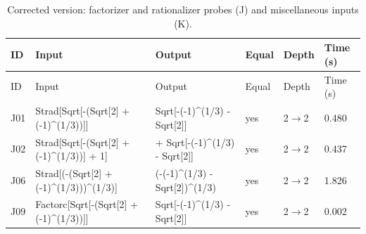 \begin{longtable}{@{}p{}>{\ttfamily\footnotesize\raggedright\arraybackslash}p{}>{\ttfamily\footnotesize\raggedright\arraybackslash}p{}p{}p{}p{}@{}}
\caption{Corrected version: factorizer and rationalizer probes (J) and miscellaneous inputs (K).}\label{tab:fixedJK}\\
\toprule ID & Input & Output & Equal & Depth & Time (s)\\\midrule\endfirsthead
\toprule ID & Input & Output & Equal & Depth & Time (s)\\\midrule\endhead
\bottomrule\endfoot
J01 & Strad[\allowbreak{}Sqrt[\allowbreak{}-(\allowbreak{}Sqrt[\allowbreak{}2]\allowbreak{} +\allowbreak{} (\allowbreak{}-1)\allowbreak{}\textasciicircum{}\allowbreak{}(\allowbreak{}1/\allowbreak{}3)\allowbreak{})\allowbreak{}]\allowbreak{}]\allowbreak{} & Sqrt[\allowbreak{}-(\allowbreak{}-1)\allowbreak{}\textasciicircum{}\allowbreak{}(\allowbreak{}1/\allowbreak{}3)\allowbreak{} -\allowbreak{} Sqrt[\allowbreak{}2]\allowbreak{}]\allowbreak{} & yes & 2$\to$2 & 0.480\\
J02 & Strad[\allowbreak{}Sqrt[\allowbreak{}-(\allowbreak{}Sqrt[\allowbreak{}2]\allowbreak{} +\allowbreak{} (\allowbreak{}-1)\allowbreak{}\textasciicircum{}\allowbreak{}(\allowbreak{}1/\allowbreak{}3)\allowbreak{})\allowbreak{}]\allowbreak{} +\allowbreak{} 1]\allowbreak{} & 1 +\allowbreak{} Sqrt[\allowbreak{}-(\allowbreak{}-1)\allowbreak{}\textasciicircum{}\allowbreak{}(\allowbreak{}1/\allowbreak{}3)\allowbreak{} -\allowbreak{} Sqrt[\allowbreak{}2]\allowbreak{}]\allowbreak{} & yes & 2$\to$2 & 0.437\\
J06 & Strad[\allowbreak{}(\allowbreak{}-(\allowbreak{}Sqrt[\allowbreak{}2]\allowbreak{} +\allowbreak{} (\allowbreak{}-1)\allowbreak{}\textasciicircum{}\allowbreak{}(\allowbreak{}1/\allowbreak{}3)\allowbreak{})\allowbreak{})\allowbreak{}\textasciicircum{}\allowbreak{}(\allowbreak{}1/\allowbreak{}3)\allowbreak{}]\allowbreak{} & (\allowbreak{}-(\allowbreak{}-1)\allowbreak{}\textasciicircum{}\allowbreak{}(\allowbreak{}1/\allowbreak{}3)\allowbreak{} -\allowbreak{} Sqrt[\allowbreak{}2]\allowbreak{})\allowbreak{}\textasciicircum{}\allowbreak{}(\allowbreak{}1/\allowbreak{}3)\allowbreak{} & yes & 2$\to$2 & 1.826\\
J09 & Factorc[\allowbreak{}Sqrt[\allowbreak{}-(\allowbreak{}Sqrt[\allowbreak{}2]\allowbreak{} +\allowbreak{} (\allowbreak{}-1)\allowbreak{}\textasciicircum{}\allowbreak{}(\allowbreak{}1/\allowbreak{}3)\allowbreak{})\allowbreak{}]\allowbreak{}]\allowbreak{} & Sqrt[\allowbreak{}-(\allowbreak{}-1)\allowbreak{}\textasciicircum{}\allowbreak{}(\allowbreak{}1/\allowbreak{}3)\allowbreak{} -\allowbreak{} Sqrt[\allowbreak{}2]\allowbreak{}]\allowbreak{} & yes & 2$\to$2 & 0.002\\

\end{longtable}
